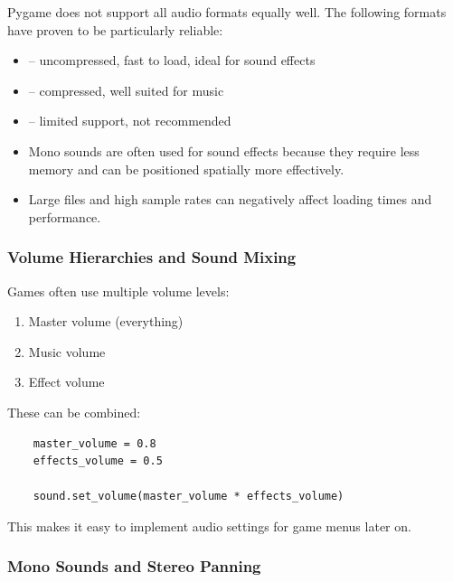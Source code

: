 Pygame does not support all audio formats equally well. The following formats have proven to be particularly reliable:

\begin{itemize}
	\item[\texttt{.wav}] -- uncompressed, fast to load, ideal for sound effects
	\item[\texttt{.ogg}] -- compressed, well suited for music
	\item[\texttt{.mp3}] -- limited support, not recommended
\end{itemize}

\newpage
\begin{warningbox}[Don'ts]
	\begin{itemize}
		\item Mono sounds are often used for sound effects because they require less memory and can be positioned spatially more effectively.
		\item Large files and high sample rates can negatively affect loading times and performance.
	\end{itemize}
\end{warningbox}

\subsubsection{Volume Hierarchies and Sound Mixing}

Games often use multiple volume levels:
\begin{enumerate}
	\item Master volume (everything)
	\item Music volume
	\item Effect volume
\end{enumerate}

These can be combined:
\lstset{firstnumber=1}
\begin{lstlisting}
	master_volume = 0.8
	effects_volume = 0.5
	
	sound.set_volume(master_volume * effects_volume)
\end{lstlisting}

This makes it easy to implement audio settings for game menus later on.

\subsubsection{Mono Sounds and Stereo Panning}

